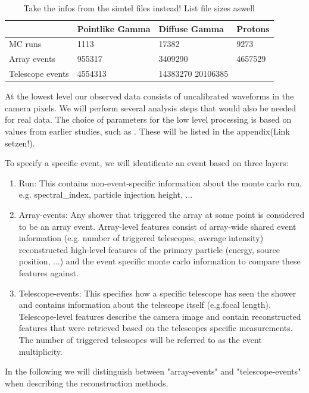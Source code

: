 \begin{table}
    \begin{center}
        \begin{tabular}{| l | l | l | l |}
            \hline
            & Pointlike Gamma & Diffuse Gamma & Protons \\
            \hline
            MC runs & \num{1113} & \num{17382} &  \num{9273} \\ 
            \hline
            Array events & \num{955317} & \num{3409290} & \num{4657529} \\
            \hline
            Telescope events & \num{4554313} & \num{14383270} \num{20106385} & 
        \end{tabular}
    \end{center}
    \caption{Take the infos from the simtel files instead! List file sizes aswell}
    \label{tab:mc_infos}
\end{table}
At the lowest level our observed data consists of uncalibrated waveforms 
in the camera pixels.
We will perform several analysis steps that would also be needed for real data.
The choice of parameters for the low level processing 
is based on values from earlier studies, such as \cite{kai_diss}.
These will be listed in the appendix(Link setzen!).

To specify a specific event, we will identificate an event based on 
three layers:
\begin{enumerate}
    \item{Run: This contains non-event-specific information about the monte carlo run, e.g.
    spectral\_index, particle injection height, ...}
    \item{Array-events: Any shower that triggered the array at some point 
    is considered to be an array event.
    Array-level features consist of array-wide shared event information 
    (e.g. number of triggered telescopes, average intensity)
    reconstructed high-level features of the primary particle (energy, source position, ...) and the 
    event specific monte carlo information to compare these features against.}
    \item{Telescope-events: This specifies how a specific telescope has seen the shower and
    contains information about the telescope itself (e.g.focal length). Telescope-level features 
    describe the camera image and contain reconstructed features that were retrieved based on 
    the telescopes specific measurements. The number of triggered telescopes will be referred
    to as the event multiplicity.}
\end{enumerate}
In the following we will 
distinguish between "array-events" and "telescope-events" when describing the reconstruction methods.

